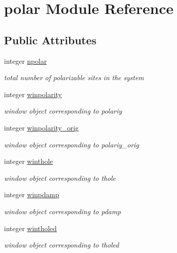 \hypertarget{classpolar}{\section{polar Module Reference}
\label{classpolar}
}
\subsection*{Public Attributes}
\begin{DoxyCompactItemize}
\item 
integer \hyperlink{classpolar_a4dab8cc73459eae728463049cf92dd4f}{npolar}
\begin{DoxyCompactList}\small\item\em total number of polarizable sites in the system \end{DoxyCompactList}\item 
integer \hyperlink{classpolar_a1d19caa1ebe353c09cab00e519cd3c56}{winpolarity}
\begin{DoxyCompactList}\small\item\em window object corresponding to polariy \end{DoxyCompactList}\item 
integer \hyperlink{classpolar_ad46b7c78e0b9c2c437c0a53dd330bfba}{winpolarity\-\_\-orig}
\begin{DoxyCompactList}\small\item\em window object corresponding to polariy\-\_\-orig \end{DoxyCompactList}\item 
integer \hyperlink{classpolar_abab52250380dd4bd332ad37ed36ac192}{winthole}
\begin{DoxyCompactList}\small\item\em window object corresponding to thole \end{DoxyCompactList}\item 
integer \hyperlink{classpolar_a4e3cb4e1ba57dc785e0dd710f69356aa}{winpdamp}
\begin{DoxyCompactList}\small\item\em window object corresponding to pdamp \end{DoxyCompactList}\item 
integer \hyperlink{classpolar_af5af16a26a1e990d4e28a1ce5c491178}{wintholed}
\begin{DoxyCompactList}\small\item\em window object corresponding to tholed \end{DoxyCompactList}\item 

\end{DoxyCompactItemize}
